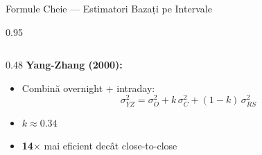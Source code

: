 \documentclass[9pt, aspectratio=169, t]{beamer}
\begin{document}
\begin{frame}[shrink=10]{Formule Cheie --- Estimatori Bazați pe Intervale}
\begin{cminipage}{0.95\textwidth}
\begin{columns}[T]
\begin{column}{0.48\textwidth}
            \textbf{Yang-Zhang (2000):}
            \begin{itemize}\setlength{\itemsep}{0pt}
                \item Combină overnight + intraday:
                \[
                \sigma_{YZ}^2 = \sigma_O^2 + k\,\sigma_C^2 + (1-k)\,\sigma_{RS}^2
                \]
                \item $k \approx 0.34$
                \item \textbf{14$\times$} mai eficient decât close-to-close
            \end{itemize}
        \end{column}
    \end{columns}
    \end{cminipage}
\end{frame}
\end{document}
